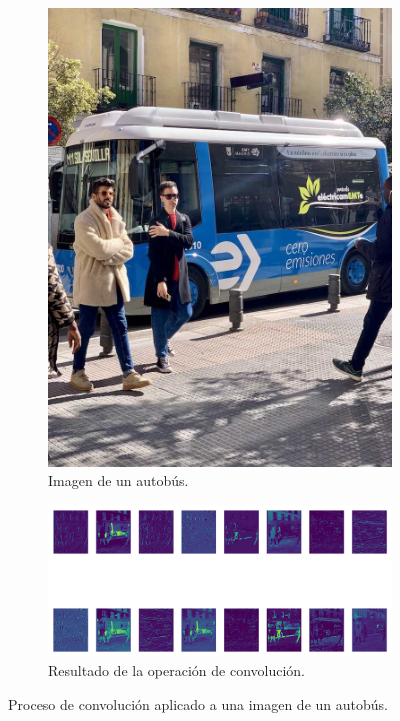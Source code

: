 \documentclass[11pt,spanish,listoffigures,listoftables]{tfgetsinf}
\begin{document}
\begin{figure}[H]
   \centering
   \begin{subfigure}[b]{0.25\textwidth}
      \centering
      \includegraphics[width=\textwidth]{images/estado_del_arte/bus_original.jpg}
      \caption{Imagen de un autobús.}
      \label{fig:bus_original}
   \end{subfigure}
   \hfill
   \begin{subfigure}[b]{0.7\textwidth}
      \centering
      \includegraphics[width=\textwidth]{images/estado_del_arte/bus_primera_capa_convolucion.png}
      \caption{Resultado de la operación de convolución.}
      \label{fig:bus_primera_capa_convolucion}
   \end{subfigure}
   \caption{Proceso de convolución aplicado a una imagen de un autobús.}
   \label{fig:bus_convolucion}
\end{figure}
\end{document}
